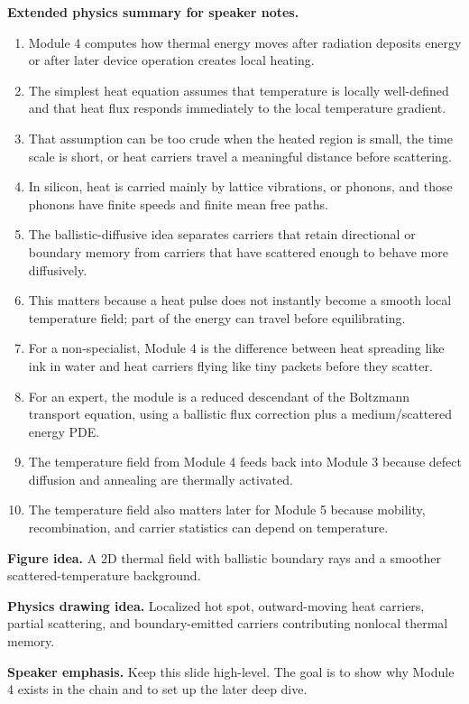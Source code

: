 \documentclass[11pt]{article}
\begin{document}
\textbf{Extended physics summary for speaker notes.}
\begin{enumerate}[leftmargin=1.6em]
    \item Module 4 computes how thermal energy moves after radiation deposits energy or after later device operation creates local heating.
    \item The simplest heat equation assumes that temperature is locally well-defined and that heat flux responds immediately to the local temperature gradient.
    \item That assumption can be too crude when the heated region is small, the time scale is short, or heat carriers travel a meaningful distance before scattering.
    \item In silicon, heat is carried mainly by lattice vibrations, or phonons, and those phonons have finite speeds and finite mean free paths.
    \item The ballistic-diffusive idea separates carriers that retain directional or boundary memory from carriers that have scattered enough to behave more diffusively.
    \item This matters because a heat pulse does not instantly become a smooth local temperature field; part of the energy can travel before equilibrating.
    \item For a non-specialist, Module 4 is the difference between heat spreading like ink in water and heat carriers flying like tiny packets before they scatter.
    \item For an expert, the module is a reduced descendant of the Boltzmann transport equation, using a ballistic flux correction plus a medium/scattered energy PDE.
    \item The temperature field from Module 4 feeds back into Module 3 because defect diffusion and annealing are thermally activated.
    \item The temperature field also matters later for Module 5 because mobility, recombination, and carrier statistics can depend on temperature.
\end{enumerate}

\textbf{Figure idea.} A 2D thermal field with ballistic boundary rays and a smoother scattered-temperature background.

\textbf{Physics drawing idea.} Localized hot spot, outward-moving heat carriers, partial scattering, and boundary-emitted carriers contributing nonlocal thermal memory.

\textbf{Speaker emphasis.} Keep this slide high-level. The goal is to show why Module 4 exists in the chain and to set up the later deep dive.
\end{document}
